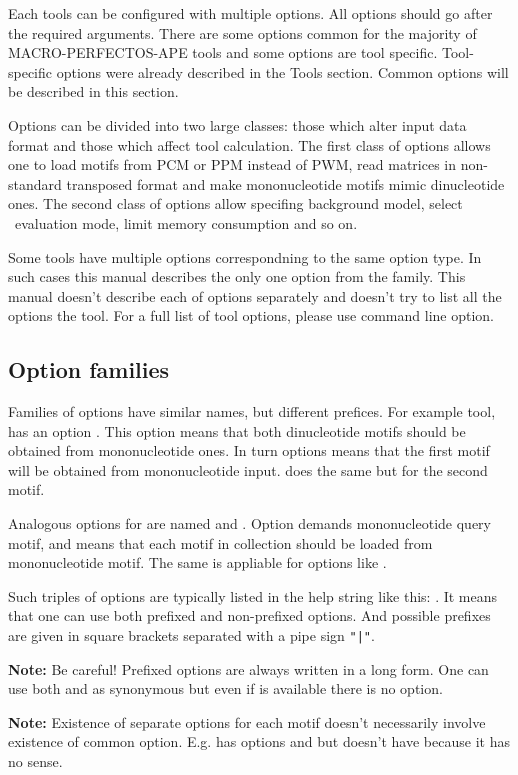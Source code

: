 Each tools can be configured with multiple options. All options should go after the required arguments. There are some options common for the majority of MACRO-PERFECTOS-APE tools and some options are tool specific. Tool-specific options were already described in the Tools section. Common options will  be described in this section.

Options can be divided into two large classes: those which alter input data format and those which affect tool calculation. The first class of options allows one to load motifs from PCM or PPM instead of PWM, read matrices in non-standard transposed format and make mononucleotide motifs mimic dinucleotide ones. The second class of options allow specifing background model, select \pvalue\ evaluation mode, limit memory consumption and so on.

Some tools have multiple options correspondning to the same option type. In such cases this manual describes the only one option from the family. This manual doesn't describe each of options separately and doesn't try to list all the options the tool. For a full list of tool options, please use  command line option.

\subsection{Option families}
{\small
Families of options have similar names, but different prefices. For example  tool, has an option . This option means that both dinucleotide motifs should be obtained from mononucleotide ones. In turn  options means that the first motif will be obtained from mononucleotide input.  does the same but for the second motif.

Analogous options for  are named  and . Option  demands mononucleotide query motif, and  means that each motif in collection should be loaded from mononucleotide motif. The same is appliable for options like .

Such triples of options are typically listed in the help string like this: . It means that one can use both prefixed and non-prefixed options. And possible prefixes are given in square brackets separated with a pipe sign \texttt{"|"}.

\textbf{Note:} Be careful! Prefixed options are always written in a long form. One can use both  and  as synonymous but even if  is available there is no  option.

\textbf{Note:} Existence of separate options for each motif doesn't necessarily involve existence of common option. E.g.  has options  and  but doesn't have  because it has no sense.
}
